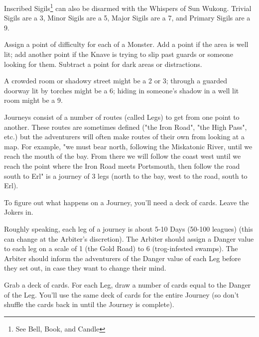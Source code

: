 {\begin{multicols}{2}
      Inscribed Sigils\footnote{See Bell, Book, and Candle} can also be disarmed with the Whispers of Sun Wukong. Trivial Sigils are a 3, Minor Sigils are a 5, Major Sigils are a 7, and Primary Sigils are a 9.


  
     Assign a point of difficulty for each \HD of a Monster.  Add a point if the area is well lit; add another point if the Knave is trying to slip past guards or someone looking for them.  Subtract a point for dark areas or distractions.

    A crowded room or shadowy street might be a 2 or 3; through a guarded doorway lit by torches might be a 6; hiding in someone's shadow in a well lit room might be a 9.




Journeys consist of a number of routes (called Legs) to get from one point to another.  These routes are sometimes defined ("the Iron Road", "the High Pass", etc.) but the adventurers will often make routes of their own from looking at a map.  For example, "we must bear north, following the Miskatonic River, until we reach the mouth of the bay.  From there we will follow the coast west until we reach the point where the Iron Road meets Portsmouth, then follow the road south to Erl" is a journey of 3 legs (north to the bay, west to the road, south to Erl).

To figure out what happens on a Journey, you'll need a deck of cards.  Leave the Jokers in.

Roughly speaking, each leg of a journey is about 5-10 Days (50-100 leagues) (this can change at the Arbiter's discretion).  The Arbiter should assign a Danger value to each leg on a scale of 1 (the Gold Road) to 6 (trog-infested swamps).  The Arbiter should inform the adventurers of the Danger value of each Leg before they set out, in case they want to change their mind.

Grab a deck of cards.  For each Leg, draw a number of cards equal to the Danger of the Leg.  You'll use the same deck of cards for the entire Journey (so don't shuffle the cards back in until the Journey is complete).


\end{multicols}}
